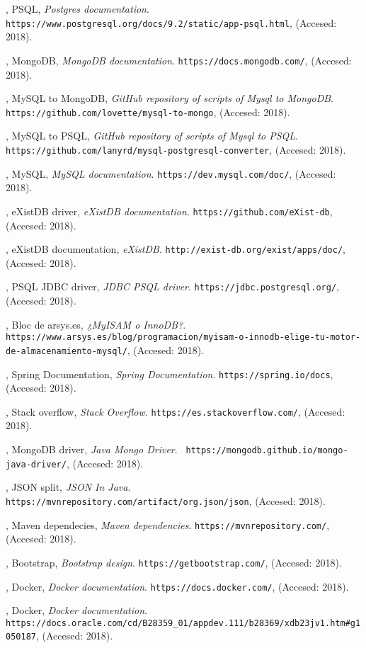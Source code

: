 \documentclass[12pt,a4paper]{article}
\begin{document}
\begin{thebibliography}{9}
,
   PSQL,
    \emph{Postgres documentation}.
    \verb|https://www.postgresql.org/docs/9.2/static/app-psql.html|,
    (Accesed: 2018).
    
,
   MongoDB,
    \emph{MongoDB documentation}.
    \verb|https://docs.mongodb.com/|,
    (Accesed: 2018).
    
,
   MySQL to MongoDB,
    \emph{GitHub repository of scripts of Mysql to MongoDB}.
    \verb|https://github.com/lovette/mysql-to-mongo|,
    (Accesed: 2018).
    
,
   MySQL to PSQL,
    \emph{GitHub repository of scripts of Mysql to PSQL}.
    \verb|https://github.com/lanyrd/mysql-postgresql-converter|,
    (Accesed: 2018).
    
,
   MySQL,
    \emph{MySQL documentation}.
    \verb|https://dev.mysql.com/doc/|,
    (Accesed: 2018).
    
,
   eXistDB driver,
    \emph{eXistDB documentation}.
    \verb|https://github.com/eXist-db|,
    (Accesed: 2018).
    
,
   eXistDB documentation,
    \emph{eXistDB}.
    \verb|http://exist-db.org/exist/apps/doc/|,
    (Accesed: 2018).
    
    
,
   PSQL JDBC driver,
    \emph{JDBC PSQL driver}.
    \verb|https://jdbc.postgresql.org/|,
    (Accesed: 2018).
    
,
   Bloc de arsys.es,
    \emph{¿MyISAM o InnoDB?}.
    \verb|https://www.arsys.es/blog/programacion/myisam-o-innodb-elige-tu-motor-de-almacenamiento-mysql/|,
    (Accesed: 2018).
    
,
    Spring Documentation,
    \emph{Spring Documentation}.
    \verb|https://spring.io/docs|,
    (Accesed: 2018).
    
,
    Stack overflow,
    \emph{Stack Overflow}.
    \verb|https://es.stackoverflow.com/|,
    (Accesed: 2018).
    
,
    MongoDB driver,
    \emph{Java Mongo Driver}.
    \verb| https://mongodb.github.io/mongo-java-driver/|,
    (Accesed: 2018).
    
,
    JSON split,
    \emph{JSON In Java}.
    \verb| https://mvnrepository.com/artifact/org.json/json|,
    (Accesed: 2018).
    
,
    Maven dependecies,
    \emph{Maven dependencies}.
    \verb|https://mvnrepository.com/|,
    (Accesed: 2018).
    
,
    Bootstrap,
    \emph{Bootstrap design}.
    \verb|https://getbootstrap.com/|,
    (Accesed: 2018).
    
,
    Docker,
    \emph{Docker documentation}.
    \verb|https://docs.docker.com/|,
    (Accesed: 2018).

,
    Docker,
    \emph{Docker documentation}.
    \verb|https://docs.oracle.com/cd/B28359_01/appdev.111/b28369/xdb23jv1.htm#g1050187|,
    (Accesed: 2018).

    


\end{thebibliography}
\end{document}
